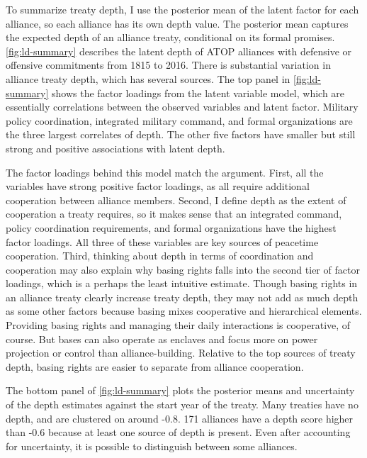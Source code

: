 \documentclass[12pt]{article}
\begin{document}
To summarize treaty depth, I use the posterior mean of the latent factor for each alliance, so each alliance has its own depth value.
The posterior mean captures the expected depth of an alliance treaty, conditional on its formal promises. 
\autoref{fig:ld-summary} describes the latent depth of ATOP alliances with defensive or offensive commitments from 1815 to 2016.
There is substantial variation in alliance treaty depth, which has several sources. 
The top panel in \autoref{fig:ld-summary} shows the factor loadings from the latent variable model, which are essentially correlations between the observed variables and latent factor. 
Military policy coordination, integrated military command, and formal organizations are the three largest correlates of depth. 
The other five factors have smaller but still strong and positive associations with latent depth. 


The factor loadings behind this model match the argument. 
First, all the variables have strong positive factor loadings, as all require additional cooperation between alliance members. 
Second, I define depth as the extent of cooperation a treaty requires, so it makes sense that an integrated command, policy coordination requirements, and formal organizations have the highest factor loadings. 
All three of these variables are key sources of peacetime cooperation. 
Third, thinking about depth in terms of coordination and cooperation may also explain why basing rights falls into the second tier of factor loadings, which is a perhaps the least intuitive estimate. 
Though basing rights in an alliance treaty clearly increase treaty depth, they may not add as much depth as some other factors because basing mixes cooperative and hierarchical elements. 
Providing basing rights and managing their daily interactions is cooperative, of course. 
But bases can also operate as enclaves and focus more on power projection or control than alliance-building.  
Relative to the top sources of treaty depth, basing rights are easier to separate from alliance cooperation. 


The bottom panel of \autoref{fig:ld-summary} plots the posterior means and uncertainty of the depth estimates against the start year of the treaty. 
Many treaties have no depth, and are clustered on around -0.8.  
171 alliances have a depth score higher than -0.6 because at least one source of depth is present. 
Even after accounting for uncertainty, it is possible to distinguish between some alliances. 
\end{document}
